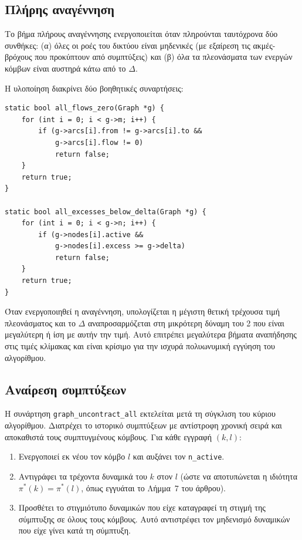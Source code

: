 \documentclass[11pt,a4paper,oneside]{report}
\let\oldsubsection\subsection
\renewcommand{\subsection}{\FloatBarrier\oldsubsection}
\begin{document}
\subsection{Πλήρης αναγέννηση}

Το βήμα πλήρους αναγέννησης ενεργοποιείται όταν πληρούνται ταυτόχρονα δύο συνθήκες: (α) όλες οι ροές του δικτύου είναι μηδενικές (με εξαίρεση τις ακμές-βρόχους που προκύπτουν από συμπτύξεις) και (β) όλα τα πλεονάσματα των ενεργών κόμβων είναι αυστηρά κάτω από το $\Delta$.

Η υλοποίηση διακρίνει δύο βοηθητικές συναρτήσεις:

\begin{verbatim}
static bool all_flows_zero(Graph *g) {
    for (int i = 0; i < g->m; i++) {
        if (g->arcs[i].from != g->arcs[i].to &&
            g->arcs[i].flow != 0)
            return false;
    }
    return true;
}

static bool all_excesses_below_delta(Graph *g) {
    for (int i = 0; i < g->n; i++) {
        if (g->nodes[i].active &&
            g->nodes[i].excess >= g->delta)
            return false;
    }
    return true;
}
\end{verbatim}

Όταν ενεργοποιηθεί η αναγέννηση, υπολογίζεται η μέγιστη θετική τρέχουσα τιμή πλεονάσματος και το $\Delta$ αναπροσαρμόζεται στη μικρότερη δύναμη του 2 που είναι μεγαλύτερη ή ίση με αυτήν την τιμή. Αυτό επιτρέπει μεγαλύτερα βήματα αναπήδησης στις τιμές κλίμακας και είναι κρίσιμο για την ισχυρά πολυωνυμική εγγύηση του αλγορίθμου.

\subsection{Αναίρεση συμπτύξεων}

Η συνάρτηση \texttt{graph\_uncontract\_all} εκτελείται μετά τη σύγκλιση του κύριου αλγορίθμου. Διατρέχει το ιστορικό συμπτύξεων με αντίστροφη χρονική σειρά και αποκαθιστά τους συμπτυγμένους κόμβους. Για κάθε εγγραφή $(k, l)$:
\begin{enumerate}
  \item Ενεργοποιεί εκ νέου τον κόμβο $l$ και αυξάνει τον \texttt{n\_active}.
  \item Αντιγράφει τα τρέχοντα δυναμικά του $k$ στον $l$ (ώστε να αποτυπώνεται η ιδιότητα $\pi^{*}(k) = \pi^{*}(l)$, όπως εγγυάται το Λήμμα~7 του άρθρου).
  \item Προσθέτει το στιγμιότυπο δυναμικών που είχε καταγραφεί τη στιγμή της σύμπτυξης σε όλους τους κόμβους. Αυτό αντιστρέφει τον μηδενισμό δυναμικών που είχε γίνει κατά τη σύμπτυξη.
\end{enumerate}
\end{document}
